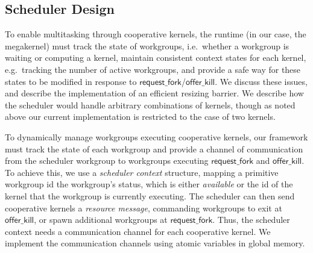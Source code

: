 \documentclass[sigconf]{acmart}
\newcommand{\kernelmerge}{\textsc{KernelMerge}}
\newcommand{\offerfork}{\mathsf{request\_fork}}
\newcommand{\offerkill}{\mathsf{offer\_kill}}
\newcommand{\getgroupid}{\mathsf{get\_group\_id}}
\newcommand{\getnumgroups}{\mathsf{get\_num\_groups}}
\begin{document}
{%
%

\subsection{Scheduler Design}\label{sec:resizingbarrier}\label{sec:schedulerimpl}

To enable multitasking through cooperative kernels, the runtime (in
our case, the megakernel) must track the state of workgroups,
i.e.\ whether a workgroup is waiting or computing a kernel, maintain
consistent context states for each kernel, e.g.\ tracking the number
of active workgroups, and provide a safe way for these states to be
modified in response to $\offerfork$/$\offerkill$. We discuss these
issues, and describe the implementation of an efficient resizing
barrier. We describe how the scheduler would handle arbitrary
combinations of kernels, though as noted above our current
implementation is restricted to the case of two kernels.

%
%
To dynamically manage workgroups executing cooperative kernels, our
framework must track the state of each workgroup and provide a channel
of communication from the scheduler workgroup to workgroups executing
$\offerfork$ and $\offerkill$. To achieve this, we use a
\emph{scheduler context} structure, mapping a primitive workgroup id
the workgroup's status, which is either \emph{available} or the id of
the kernel that the workgroup is currently executing.  The scheduler
can then send cooperative kernels a \emph{resource message},
commanding workgroups to exit at $\offerkill$, or spawn additional
workgroups at $\offerfork$. Thus, the scheduler context needs a
communication channel for each cooperative kernel. We implement the
communication channels using atomic variables in global memory.

}
\end{document}
